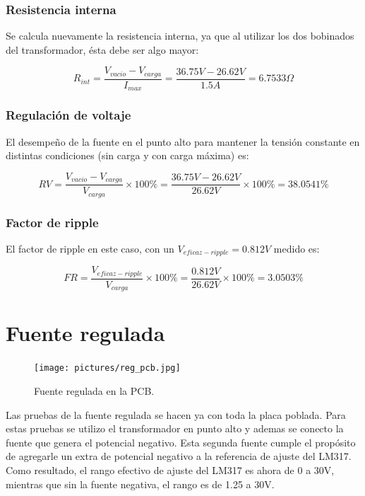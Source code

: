 \documentclass[chaptersright]{informeutn}
\begin{document}
        \subsubsection{Resistencia interna}

        Se calcula nuevamente la resistencia interna, ya que al utilizar los dos bobinados del transformador, ésta
        debe ser algo mayor:

        \begin{equation*}
            R_{int} = \frac{V_{vacio} - V_{carga}}{I_{max}}= \frac{36.75V - 26.62V}{1.5A} = 6.7533\Omega
        \end{equation*}

        \subsubsection{Regulación de voltaje}

        El desempeño de la fuente en el punto alto para mantener la tensión constante en distintas condiciones (sin carga
        y con carga máxima) es:

        \begin{equation*}
            RV = \frac{V_{vacio} -V_{carga}}{V_{carga}} \times 100\% = \frac{36.75V-26.62V}{26.62V} \times 100\% = 38.0541\%
        \end{equation*}

        \subsubsection{Factor de ripple}

        El factor de ripple en este caso, con un $V_{eficaz-ripple}=0.812V$ medido es:

        \begin{equation*}
            FR = \frac{V_{eficaz-ripple}}{V_{carga}} \times 100\% = \frac{0.812V}{26.62V} \times 100\% = 3.0503\%
        \end{equation*}

    \section{Fuente regulada}
      \begin{figure}
        \centering
        \texttt{[image: pictures/reg\_pcb.jpg]}
        \caption{Fuente regulada en la PCB.}
      \end{figure}

      Las pruebas de la fuente regulada se hacen ya con toda la placa poblada. Para estas pruebas se utilizo el
      transformador en punto alto y ademas se conecto la fuente que genera el potencial negativo. Esta segunda fuente
      cumple el propósito de agregarle un extra de potencial negativo a la referencia de ajuste del LM317. Como
      resultado, el rango efectivo de ajuste del LM317 es ahora de 0 a 30V, mientras que sin la fuente negativa,
      el rango es de 1.25 a 30V.
\end{document}
